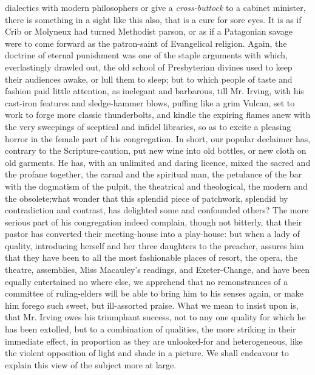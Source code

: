 dialectics with modern philosophers or give a \emph{cross-buttock} to a
cabinet minister, there is something in a sight like this also,
that is a cure for sore eyes. It is as if Crib or Molyneux had
turned Methodist parson, or as if a Patagonian savage were to come
forward as the patron-saint of Evangelical religion. Again, the
doctrine of eternal punishment was one of the staple arguments
with which, everlastingly drawled out, the old school of
Presbyterian divines used to keep their audiences awake, or lull
them to sleep; but to which people of taste and fashion paid
little attention, as inelegant and barbarous, till Mr. Irving,
with his cast-iron features and sledge-hammer blows, puffing like
a grim Vulcan, set to work to forge more classic thunderbolts, and
kindle the expiring flames anew with the very sweepings of
sceptical and infidel libraries, so as to excite a pleasing horror
in the female part of his congregation. In short, our popular
declaimer has, contrary to the Scripture-caution, put new wine
into old bottles, or new cloth on old garments. He has, with an
unlimited and daring licence, mixed the sacred and the profane
together, the carnal and the spiritual man, the petulance of the
bar with the dogmatism of the pulpit, the theatrical and
theological, the modern and the obsolete;\textemdash what wonder
that this splendid piece of patchwork, splendid by contradiction
and contrast, has delighted some and confounded others? The more
serious part of his congregation indeed complain, though not
bitterly, that their pastor has converted their meeting-house into
a play-house: but when a lady of quality, introducing herself and
her three daughters to the preacher, assures him that they have
been to all the most fashionable places of resort, the opera, the
theatre, assemblies, Miss Macauley's readings, and Exeter-Change,
and have been equally entertained no where else, we apprehend that
no remonstrances of a committee of ruling-elders will be able to
bring him to his senses again, or make him forego such sweet, but
ill-assorted praise. What we mean to insist upon is, that
Mr. Irving owes his triumphant success, not to any one quality for
which he has been extolled, but to a combination of qualities, the
more striking in their immediate effect, in proportion as they are
unlooked-for and heterogeneous, like the violent opposition of
light and shade in a picture. We shall endeavour to explain this
view of the subject more at large.

